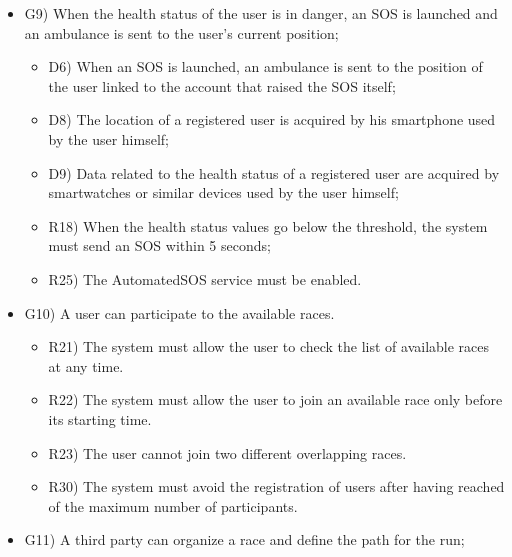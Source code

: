 \documentclass{article}
\begin{document}
\begin{legal}
\begin{legal}
\begin{legal}
\begin{itemize}
{\begin{itemize}
					\end{itemize}
				}
				\item G9) When the health status of the user is in danger, an SOS is launched and an ambulance is sent to the user’s current position;\\
				{\normalfont
					\begin{itemize}
					\item D6) When an SOS is launched, an ambulance is sent to the position of the user linked to the account that raised the SOS itself;\\
					\item D8) The location of a registered user is acquired by his smartphone used by the user himself;\\
	 				\item D9) Data related to the health status of a registered user are acquired by smartwatches or similar devices used by the user himself;\\
					\item R18) When the health status values go below the threshold, the system must send an SOS within 5 seconds;\\
	 				\item R25) The AutomatedSOS service must be enabled.\\
					\end{itemize}
				}
				\item G10) A user can participate to the available races. \\
				{\normalfont
					\begin{itemize}
					\item R21) The system must allow the user to check the list of available races at any time.\\
					\item R22) The system must allow the user to join an available race only before its starting time.\\
	 				\item R23) The user cannot join two different overlapping races.\\
					\item R30) The system must avoid the registration of users after having reached of the maximum number of participants.\\
					\end{itemize}
				}
				\item G11) A third party can organize a race and define the path for the run;\\
				{\normalfont
					\begin{itemize}

\end{itemize}}
\end{itemize}
\end{legal}
\end{legal}
\end{legal}
\end{document}
